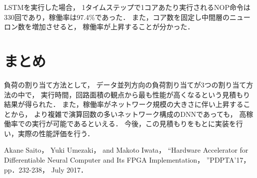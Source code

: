 \documentclass[a4j]{jarticle}
\begin{document}
\begin{Abstract}
LSTMを実行した場合，
1タイムステップで1コアあたり実行されるNOP命令は330回であり，稼働率は97.4\%であった．
また，コア数を固定し中間層のニューロン数を増加させると，
稼働率が上昇することが分かった．
 \section{まとめ}
負荷の割り当て方法として，
データ並列方向の負荷割り当てが3つの割り当て方法の中で，
実行時間，回路面積の観点から最も性能が高くなるという見積もり結果が得られた．
また，稼働率がネットワーク規模の大きさに伴い上昇することから，
より複雑で演算回数の多いネットワーク構成のDNNであっても，
高稼働率での実行が可能であるといえる．
今後，この見積もりをもとに実装を行い，実際の性能評価を行う．


\begin{thebibliography}{99}
  Akane Saito， Yuki Umezaki， and Makoto Iwata，
  ``Hardware Accelerator for Differentiable Neural Computer and Its FPGA Implementation，
  ''PDPTA'17， pp．232-238， July 2017．
\end{thebibliography}

\end{Abstract}
\end{document}
